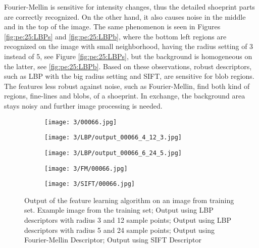 \documentclass[draft,final]{vutinfth} %
\begin{document}
Fourier-Mellin is sensitive for intensity changes, thus the detailed shoeprint parts are correctly recognized.
On the other hand, it also causes noise in the middle and in the top of the image.
The same phenomenon is seen in Figures  \ref{fig:pe:25:LBPs} and  \ref{fig:pe:25:LBPb}, where the bottom left regions are recognized on the image  with small neighborhood, having the radius setting of 3 instead of 5, see Figure \ref{fig:pe:25:LBPs}, but the background is homogeneous on the latter, see \ref{fig:pe:25:LBPb}. 
Based on these observations, robust descriptors, such as LBP with the big radius setting and SIFT, are sensitive for blob regions.
The features less robust against noise, such as Fourier-Mellin, find both kind of regions, fine-lines and blobs,  of a shoeprint.
In exchange, the background area stays noisy and further image processing is needed.

\begin{figure}[h]
  \centering
  \begin{subfigure}[t]{0.19\columnwidth}
    \centering
    \texttt{[image: 3/00066.jpg]}
    \subcaption{}
    \label{fig:pe:66:orig}
  \end{subfigure}
  \begin{subfigure}[t]{0.19\columnwidth}
    \centering
    \texttt{[image: 3/LBP/output\_00066\_4\_12\_3.jpg]}
    \subcaption{}
    \label{fig:pe:66:LBPs}
  \end{subfigure}
  \begin{subfigure}[t]{0.19\columnwidth}
    \centering
    \texttt{[image: 3/LBP/output\_00066\_6\_24\_5.jpg]}
    \subcaption{}
    \label{fig:pe:66:LBPb}
  \end{subfigure}
  \begin{subfigure}[t]{0.19\columnwidth}
    \centering
    \texttt{[image: 3/FM/00066.jpg]}
    \subcaption{}
    \label{fig:pe:66:FM}
  \end{subfigure}
  \begin{subfigure}[t]{0.19\columnwidth}
    \centering
    \texttt{[image: 3/SIFT/00066.jpg]}
    \subcaption{}
    \label{fig:pe:66:SIFT}
  \end{subfigure}
  \caption{Output of the feature learning algorithm on an image from training set.  Example image from the training set;  Output using LBP descriptors with radius 3 and 12 sample points;  Output using LBP descriptors with radius 5 and 24 sample points;  Output using Fourier-Mellin Descriptor;  Output using SIFT Descriptor}
  \label{fig:pe:66}
\end{figure}
\end{document}

